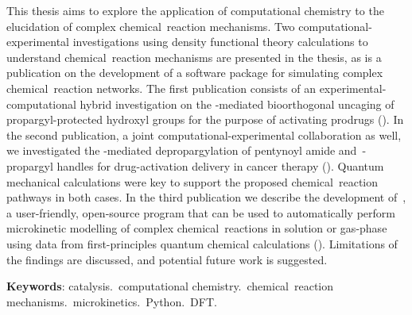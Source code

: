 \begin{resumo}[Abstract]
	This thesis aims to explore the application of computational chemistry to the elucidation of complex chemical~reaction mechanisms.
	Two computational-experimental investigations using density functional theory calculations to understand chemical~reaction mechanisms are presented in the thesis,
	as is a publication on the development of a software package for simulating complex chemical~reaction networks.
	The first publication consists of an experimental-computational hybrid investigation on the -mediated bioorthogonal uncaging of propargyl-protected hydroxyl groups for the purpose of activating prodrugs
	().
	In the second publication,
	a joint computational-experimental collaboration as well,
	we investigated the -mediated depropargylation of pentynoyl amide and~-propargyl handles for drug-activation delivery in cancer therapy
	().
	Quantum mechanical calculations were key to support the proposed chemical~reaction pathways in both cases.
	In the third publication
	we describe the development of~\overreact{},
	a user-friendly,
	open-source program that can be used
	to automatically perform microkinetic modelling of complex chemical~reactions in solution or gas-phase
	using data from first-principles quantum chemical calculations
	().
	Limitations of the findings are discussed,
	and potential future work is suggested.

	\vspace{\onelineskip}

	\noindent
	\textbf{Keywords}:
	catalysis.\ computational chemistry.\ chemical~reaction mechanisms.\ microkinetics.\ Python.\ DFT.\@
\end{resumo}

